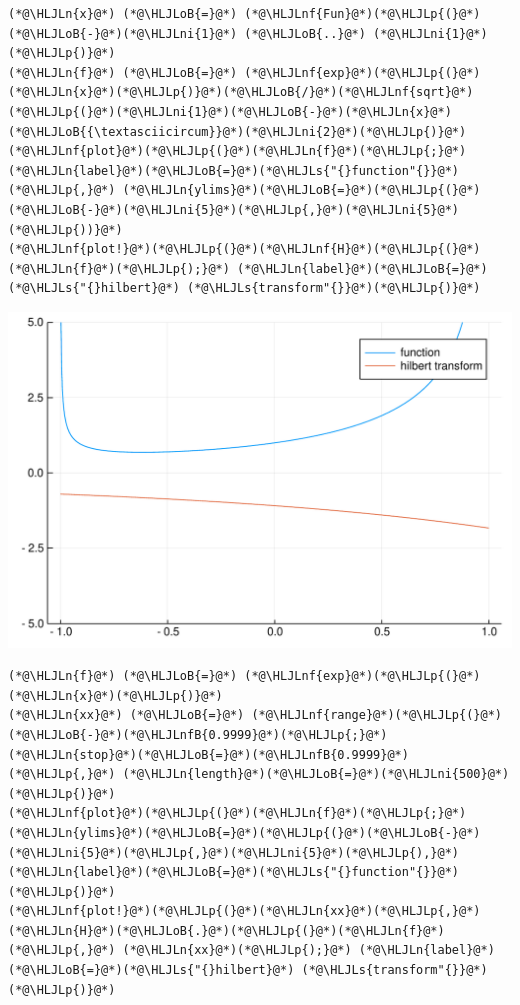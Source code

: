 \documentclass[12pt,a4paper]{article}
\newcommand{\HLJLn}[1]{#1}
\newcommand{\HLJLnf}[1]{\textcolor[RGB]{66,102,213}{#1}}
\newcommand{\HLJLs}[1]{\textcolor[RGB]{201,61,57}{#1}}
\newcommand{\HLJLnfB}[1]{\textcolor[RGB]{59,151,46}{#1}}
\newcommand{\HLJLni}[1]{\textcolor[RGB]{59,151,46}{#1}}
\newcommand{\HLJLoB}[1]{\textcolor[RGB]{102,102,102}{\textbf{#1}}}
\newcommand{\HLJLp}[1]{#1}
\begin{document}
\begin{lstlisting}
(*@\HLJLn{x}@*) (*@\HLJLoB{=}@*) (*@\HLJLnf{Fun}@*)(*@\HLJLp{(}@*)(*@\HLJLoB{-}@*)(*@\HLJLni{1}@*) (*@\HLJLoB{..}@*) (*@\HLJLni{1}@*)(*@\HLJLp{)}@*)
(*@\HLJLn{f}@*) (*@\HLJLoB{=}@*) (*@\HLJLnf{exp}@*)(*@\HLJLp{(}@*)(*@\HLJLn{x}@*)(*@\HLJLp{)}@*)(*@\HLJLoB{/}@*)(*@\HLJLnf{sqrt}@*)(*@\HLJLp{(}@*)(*@\HLJLni{1}@*)(*@\HLJLoB{-}@*)(*@\HLJLn{x}@*)(*@\HLJLoB{{\textasciicircum}}@*)(*@\HLJLni{2}@*)(*@\HLJLp{)}@*)
(*@\HLJLnf{plot}@*)(*@\HLJLp{(}@*)(*@\HLJLn{f}@*)(*@\HLJLp{;}@*) (*@\HLJLn{label}@*)(*@\HLJLoB{=}@*)(*@\HLJLs{"{}function"{}}@*)(*@\HLJLp{,}@*) (*@\HLJLn{ylims}@*)(*@\HLJLoB{=}@*)(*@\HLJLp{(}@*)(*@\HLJLoB{-}@*)(*@\HLJLni{5}@*)(*@\HLJLp{,}@*)(*@\HLJLni{5}@*)(*@\HLJLp{))}@*)
(*@\HLJLnf{plot!}@*)(*@\HLJLp{(}@*)(*@\HLJLnf{H}@*)(*@\HLJLp{(}@*)(*@\HLJLn{f}@*)(*@\HLJLp{);}@*) (*@\HLJLn{label}@*)(*@\HLJLoB{=}@*)(*@\HLJLs{"{}hilbert}@*) (*@\HLJLs{transform"{}}@*)(*@\HLJLp{)}@*)
\end{lstlisting}

\includegraphics[width=\linewidth]{figures/Lecture14_3_1.pdf}

\begin{lstlisting}
(*@\HLJLn{f}@*) (*@\HLJLoB{=}@*) (*@\HLJLnf{exp}@*)(*@\HLJLp{(}@*)(*@\HLJLn{x}@*)(*@\HLJLp{)}@*)
(*@\HLJLn{xx}@*) (*@\HLJLoB{=}@*) (*@\HLJLnf{range}@*)(*@\HLJLp{(}@*)(*@\HLJLoB{-}@*)(*@\HLJLnfB{0.9999}@*)(*@\HLJLp{;}@*) (*@\HLJLn{stop}@*)(*@\HLJLoB{=}@*)(*@\HLJLnfB{0.9999}@*)(*@\HLJLp{,}@*) (*@\HLJLn{length}@*)(*@\HLJLoB{=}@*)(*@\HLJLni{500}@*)(*@\HLJLp{)}@*)
(*@\HLJLnf{plot}@*)(*@\HLJLp{(}@*)(*@\HLJLn{f}@*)(*@\HLJLp{;}@*) (*@\HLJLn{ylims}@*)(*@\HLJLoB{=}@*)(*@\HLJLp{(}@*)(*@\HLJLoB{-}@*)(*@\HLJLni{5}@*)(*@\HLJLp{,}@*)(*@\HLJLni{5}@*)(*@\HLJLp{),}@*) (*@\HLJLn{label}@*)(*@\HLJLoB{=}@*)(*@\HLJLs{"{}function"{}}@*)(*@\HLJLp{)}@*)
(*@\HLJLnf{plot!}@*)(*@\HLJLp{(}@*)(*@\HLJLn{xx}@*)(*@\HLJLp{,}@*) (*@\HLJLn{H}@*)(*@\HLJLoB{.}@*)(*@\HLJLp{(}@*)(*@\HLJLn{f}@*)(*@\HLJLp{,}@*) (*@\HLJLn{xx}@*)(*@\HLJLp{);}@*) (*@\HLJLn{label}@*)(*@\HLJLoB{=}@*)(*@\HLJLs{"{}hilbert}@*) (*@\HLJLs{transform"{}}@*)(*@\HLJLp{)}@*)
\end{lstlisting}
\end{document}
